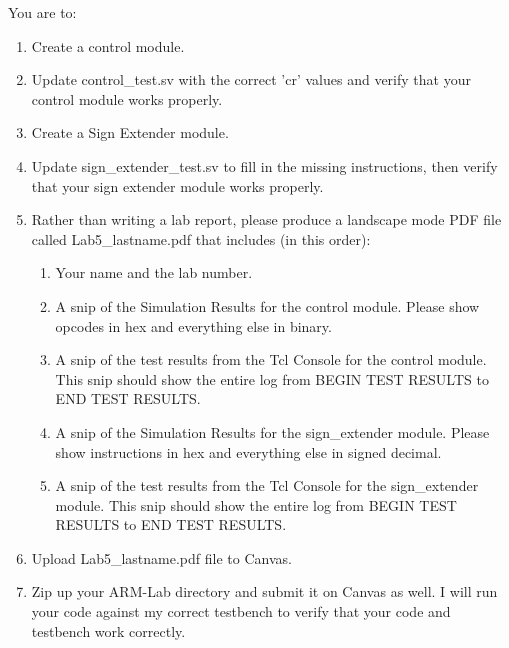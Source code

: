 You are to:
\begin{enumerate}
\item Create a control module.
\item Update control\_test.sv with the correct 'cr' values and verify that your control module works properly.
\item Create a Sign Extender module.
\item Update sign\_extender\_test.sv to fill in the missing instructions, then verify that your sign extender module works properly.
\item Rather than writing a lab report, please produce a landscape mode PDF file called Lab5\_lastname.pdf that includes (in this order):
\begin{enumerate}
	\item Your name and the lab number.
	\item A snip of the Simulation Results for the control module.  Please show opcodes in hex and everything else in binary.  
	\item A snip of the test results from the Tcl Console for the control module.  This snip should show the entire log from BEGIN TEST RESULTS to END TEST RESULTS.
	\item A snip of the Simulation Results for the sign\_extender module.  Please show instructions in hex and everything else in signed decimal.  
	\item A snip of the test results from the Tcl Console for the sign\_extender module.  This snip should show the entire log from BEGIN TEST RESULTS to END TEST RESULTS.	
\end{enumerate}
\item Upload Lab5\_lastname.pdf file to Canvas.
\item Zip up your ARM-Lab directory and submit it on Canvas as well.  I will run your code against my correct testbench to verify that your code and testbench work correctly.
\end{enumerate} 